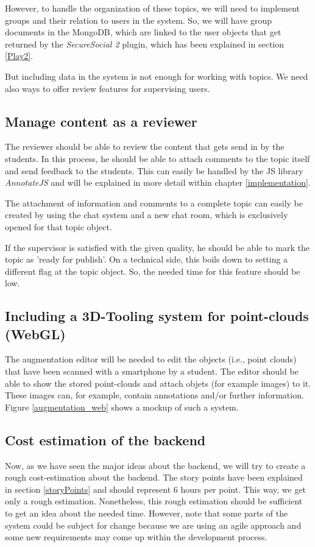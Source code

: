 However, to handle the organization of these topics, we will need to implement groups and their relation to users in the system. So, we will have group documents in the MongoDB, which are linked to the user objects that get returned by the \emph{SecureSocial 2} plugin, which has been explained in section \ref{Play2}.

But including data in the system is not enough for working with topics. We need also ways to offer review features for supervising users. 

\subsection{Manage content as a reviewer}
The reviewer should be able to review the content that gets send in by the students. In this process, he should be able to attach comments to the topic itself and send feedback to the students. This can easily be handled by the \ac{JS} library \emph{AnnotateJS} and will be explained in more detail within chapter \ref{implementation}.

The attachment of information and comments to a complete topic can easily be created by using the chat system and a new chat room, which is exclusively opened for that topic object. 

If the supervisor is satisfied with the given quality, he should be able to mark the topic as 'ready for publish'. On a technical side, this boils down to setting a different flag at the topic object. So, the needed time for this feature should be low.

\subsection{Including a 3D-Tooling system for point-clouds (WebGL)}
The augmentation editor will be needed to edit the objects (i.e., point clouds) that have been scanned with a smartphone by a student. 
The editor should be able to show the stored point-clouds and attach objets (for example images) to it. These images can, for example, contain annotations and/or further information. Figure \ref{augmentation_web} shows a mockup of such a system. 

\subsection{Cost estimation of the backend}
\label{backendEstimation}
Now, as we have seen the major ideas about the backend, we will try to create a rough cost-estimation about the backend. The story points have been explained in section \ref{storyPoints} and should represent 6 hours per point. This way, we get only a rough estimation. Nonetheless, this rough estimation should be sufficient to get an idea about the needed time. However, note that some parts of the system could be subject for change because we are using an agile approach and some new requirements may come up within the development process.

